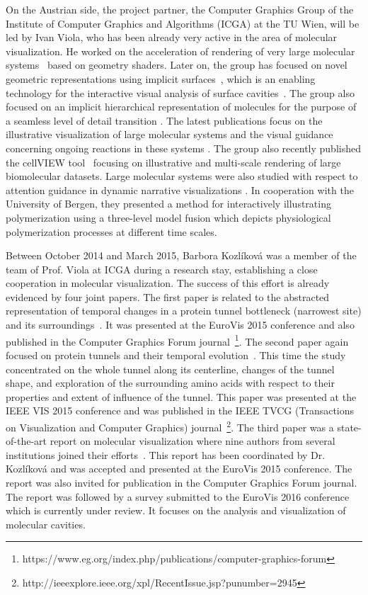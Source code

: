 \documentclass[11pt,a4paper,titlepage,oneside,onecolumn]{article}
\begin{document}
On the Austrian side, the project partner, the Computer Graphics Group of the Institute of Computer
Graphics and Algorithms (ICGA) at the TU Wien, will be led by Ivan Viola, who has been already very active in the area of molecular visualization. 
He worked on the acceleration of rendering of very large molecular systems~\cite{lampe} based on geometry shaders. 
Later on, the group has focused on novel geometric representations using implicit surfaces~\cite{ParulekViola2012}, which is an enabling technology for the interactive visual analysis of surface cavities~\cite{parulek2012implicit,parulek13visualanalysis}. 
The group also focused on an implicit hierarchical representation of molecules for the purpose of a seamless level of detail transition \cite{parulek13seamless}.
The latest publications focus on the illustrative visualization of large molecular systems and the visual guidance concerning ongoing reactions in these systems \cite{Muzic2014}.
The group also recently published the cellVIEW tool~\cite{cellview} focusing on illustrative and multi-scale rendering  of large biomolecular datasets. 
Large molecular systems were also studied with respect to attention guidance in dynamic narrative visualizations \cite{waldner}. 
In cooperation with the University of Bergen, they presented a method for interactively illustrating polymerization using a three-level model fusion \cite{kolesar} which depicts physiological polymerization processes at different time scales.
 
Between October 2014 and March 2015, Barbora Kozl\'{i}kov\'{a} was a member of the team of Prof. Viola at ICGA during a research stay, establishing a close cooperation in molecular visualization. 
The success of this effort is already evidenced by four joint papers. 
The first paper is related to the abstracted representation of temporal changes in a protein tunnel bottleneck (narrowest site) and its surroundings~\cite{molecollar}. 
It was presented at the EuroVis 2015 conference and also published in the Computer Graphics Forum journal~\footnote{https://www.eg.org/index.php/publications/computer-graphics-forum}. 
The second paper again focused on protein tunnels and their temporal evolution~\cite{animoamino}.
This time the study concentrated on the whole tunnel along its centerline, changes of the tunnel shape, and exploration of the surrounding amino acids with respect to their properties and extent of influence of the tunnel.
This paper was presented at the IEEE VIS 2015 conference and was published in the IEEE TVCG (Transactions on Visualization and Computer Graphics) journal~\footnote{http://ieeexplore.ieee.org/xpl/RecentIssue.jsp?punumber=2945}.
The third paper was a state-of-the-art report on molecular visualization where nine authors from several institutions joined their efforts~\cite{kozlikova_visualization_2015}. 
This report has been coordinated by Dr. Kozl\'{i}kov\'{a} and was accepted and presented at the EuroVis 2015 conference. The report was also invited for publication in the Computer Graphics Forum journal.
The report was followed by a survey submitted to the EuroVis 2016 conference which is currently under review. 
It focuses on the analysis and visualization of molecular cavities.
\end{document}
